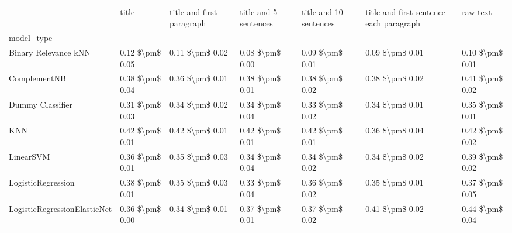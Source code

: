 \begin{tabular}{lllllll}
\toprule
{} &            title & title and first paragraph & title and 5 sentences & title and 10 sentences & title and first sentence each paragraph &             raw text \\
model\_type                      &                  &                           &                       &                        &                                         &                      \\
\midrule
Binary Relevance kNN            &  0.12 \$\textbackslash pm\$ 0.05 &           0.11 \$\textbackslash pm\$ 0.02 &       0.08 \$\textbackslash pm\$ 0.00 &        0.09 \$\textbackslash pm\$ 0.01 &                         0.09 \$\textbackslash pm\$ 0.01 &      0.10 \$\textbackslash pm\$ 0.01 \\
ComplementNB                    &  0.38 \$\textbackslash pm\$ 0.04 &           0.36 \$\textbackslash pm\$ 0.01 &       0.38 \$\textbackslash pm\$ 0.01 &        0.38 \$\textbackslash pm\$ 0.02 &                         0.38 \$\textbackslash pm\$ 0.02 &      0.41 \$\textbackslash pm\$ 0.02 \\
Dummy Classifier                &  0.31 \$\textbackslash pm\$ 0.03 &           0.34 \$\textbackslash pm\$ 0.02 &       0.34 \$\textbackslash pm\$ 0.04 &        0.33 \$\textbackslash pm\$ 0.02 &                         0.34 \$\textbackslash pm\$ 0.01 &      0.35 \$\textbackslash pm\$ 0.01 \\
KNN                             &  0.42 \$\textbackslash pm\$ 0.01 &           0.42 \$\textbackslash pm\$ 0.01 &       0.42 \$\textbackslash pm\$ 0.01 &        0.42 \$\textbackslash pm\$ 0.01 &                         0.36 \$\textbackslash pm\$ 0.04 &      0.42 \$\textbackslash pm\$ 0.02 \\
LinearSVM                       &  0.36 \$\textbackslash pm\$ 0.01 &           0.35 \$\textbackslash pm\$ 0.03 &       0.34 \$\textbackslash pm\$ 0.04 &        0.34 \$\textbackslash pm\$ 0.02 &                         0.34 \$\textbackslash pm\$ 0.02 &      0.39 \$\textbackslash pm\$ 0.02 \\
LogisticRegression              &  0.38 \$\textbackslash pm\$ 0.01 &           0.35 \$\textbackslash pm\$ 0.03 &       0.33 \$\textbackslash pm\$ 0.04 &        0.36 \$\textbackslash pm\$ 0.02 &                         0.35 \$\textbackslash pm\$ 0.01 &      0.37 \$\textbackslash pm\$ 0.05 \\
LogisticRegressionElasticNet    &  0.36 \$\textbackslash pm\$ 0.00 &           0.34 \$\textbackslash pm\$ 0.01 &       0.37 \$\textbackslash pm\$ 0.01 &        0.37 \$\textbackslash pm\$ 0.02 &                         0.41 \$\textbackslash pm\$ 0.02 &      0.44 \$\textbackslash pm\$ 0.04 \\

\end{tabular}
